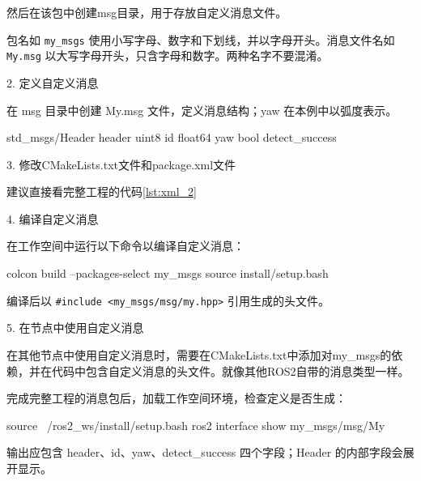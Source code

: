 然后在该包中创建msg目录，用于存放自定义消息文件。


\begin{note}
包名如 \texttt{my\_msgs} 使用小写字母、数字和下划线，并以字母开头。消息文件名如 \texttt{My.msg} 以大写字母开头，只含字母和数字。两种名字不要混淆。
\end{note}


2. 定义自定义消息

在 msg 目录中创建 My.msg 文件，定义消息结构；yaw 在本例中以弧度表示。
\par\medskip\noindent\begin{minipage}{\linewidth}
\begin{tbash}
    std_msgs/Header header
    uint8 id
    float64 yaw
    bool detect_success
\end{tbash}
\end{minipage}\par\smallskip

3. 修改CMakeLists.txt文件和package.xml文件

建议直接看完整工程的代码\ref{lst:xml_2}

4. 编译自定义消息

在工作空间中运行以下命令以编译自定义消息：
\par\medskip\noindent\begin{minipage}{\linewidth}
\begin{tbash}
    colcon build --packages-select my_msgs
    source install/setup.bash
\end{tbash}
\end{minipage}\par\smallskip

编译后以 \texttt{\#include <my\_msgs/msg/my.hpp>} 引用生成的头文件。

5. 在节点中使用自定义消息

在其他节点中使用自定义消息时，需要在CMakeLists.txt中添加对my\_msgs的依赖，并在代码中包含自定义消息的头文件。就像其他ROS2自带的消息类型一样。


\begin{example}
完成完整工程的消息包后，加载工作空间环境，检查定义是否生成：
\par\medskip\noindent\begin{minipage}{\linewidth}
\begin{tbash}
source ~/ros2_ws/install/setup.bash
ros2 interface show my_msgs/msg/My
\end{tbash}
\end{minipage}\par\smallskip
输出应包含 header、id、yaw、detect\_success 四个字段；Header 的内部字段会展开显示。
\end{example}

